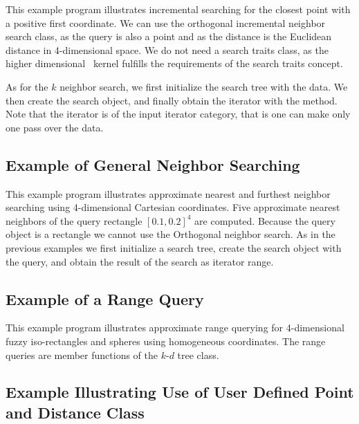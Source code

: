 This example program illustrates incremental searching for the closest
point with a positive first coordinate. We can use the orthogonal
incremental neighbor search class, as the query is also a point and as
the distance is the Euclidean distance in 4-dimensional space. We
do not need a search traits class, as the higher dimensional \cgal\ kernel fulfills the requirements of the search traits concept.

As for the $k$ neighbor search, we first initialize the search tree with
the data. We then create the search object, and finally obtain the iterator
with the  method. Note that the iterator is of the input
iterator category, that is one can make only one pass over the data. 

 


\newpage
\subsection{Example of General Neighbor Searching}

This example program illustrates approximate nearest and furthest
neighbor searching using 4-dimensional Cartesian coordinates.  Five
approximate nearest neighbors of the query rectangle
$[0.1,0.2]^4$ are computed. Because the query object is a rectangle
we cannot use the Orthogonal neighbor search. As in the previous 
examples we first initialize a search tree, create the search object
with the query, and obtain the result of the search as iterator range.
 

\newpage
\subsection{Example of a Range Query}

This example program illustrates approximate range querying for
4-dimensional fuzzy iso-rectangles and spheres using homogeneous
coordinates. The range queries are member functions of the $k$-$d$ 
tree class.




\newpage
\subsection{Example Illustrating Use of User Defined Point and Distance Class}

